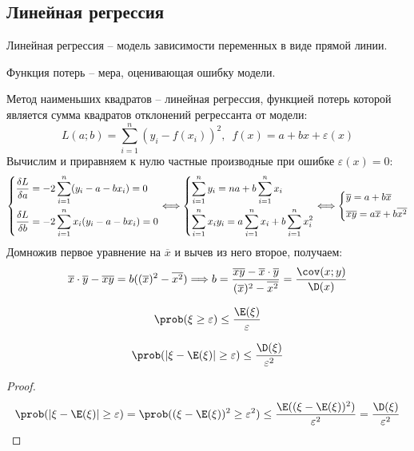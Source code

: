 \documentclass[12pt]{article}
\begin{document}
\subsection{Линейная регрессия}

\begin{definition}
    Линейная регрессия -- модель зависимости переменных в виде прямой линии.
\end{definition}
\begin{definition}
    Функция потерь -- мера, оценивающая ошибку модели.
\end{definition}
\begin{definition}
    Метод наименьших квадратов -- линейная регрессия, функцией потерь которой является сумма квадратов отклонений регрессанта от модели:
    $$L(a;b)=\sum_{i=1}^n(y_i-f(x_i))^2,\enspace f(x)=a+bx+\varepsilon(x)$$
    Вычислим и приравняем к нулю частные производные при ошибке $\varepsilon(x)=0$:
    $$\begin{dcases}
        \dfrac{\delta L}{\delta a}=-2\sum_{i=1}^{n}(y_i-a-bx_i)=0\\
        \dfrac{\delta L}{\delta b}=-2\sum_{i=1}^{n}x_i(y_i-a-bx_i)=0
    \end{dcases}\Longleftrightarrow\begin{dcases}
        \sum_{i=1}^{n}y_i=na+b\sum_{i=1}^{n}x_i\\
        \sum_{i=1}^{n}x_iy_i=a\sum_{i=1}^{n}x_i+b\sum_{i=1}^{n}x_i^2
    \end{dcases}\Longleftrightarrow\begin{dcases}
        \overline{y}=a+b\overline{x}\\
        \overline{xy}=a\overline{x}+b\overline{x^2}
    \end{dcases}$$
    Домножив первое уравнение на $\overline{x}$ и вычев из него второе, получаем:
    $$\overline{x}\cdot\overline{y}-\overline{xy}=b((\overline{x})^2-\overline{x^2})\Longrightarrow b=\frac{\overline{xy}-\overline{x}\cdot\overline{y}}{(\overline{x})^2-\overline{x^2}}=\frac{\cov(x;y)}{\D(x)}$$
\end{definition}
\begin{theorem}
    $$\prob(\xi\geq\varepsilon)\leq\frac{\E(\xi)}{\varepsilon}$$
\end{theorem}
\begin{theorem}
    $$\prob(|\xi-\E(\xi)|\geq\varepsilon)\leq\frac{\D(\xi)}{\varepsilon^2}$$
\end{theorem}
\begin{proof}
    $$\prob(|\xi-\E(\xi)|\geq\varepsilon)=\prob((\xi-\E(\xi))^2\geq\varepsilon^2)\leq\frac{\E((\xi-\E(\xi))^2)}{\varepsilon^2}=\frac{\D(\xi)}{\varepsilon^2}$$
\end{proof}
\end{document}
